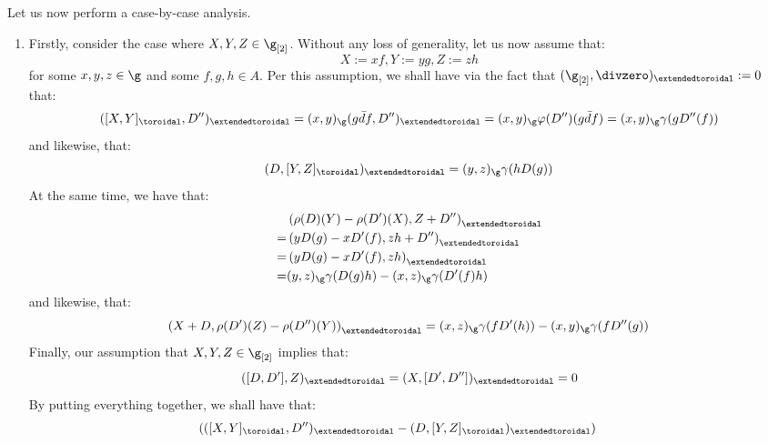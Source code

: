                 Let us now perform a case-by-case analysis.
                \begin{enumerate}
                    \item Firstly, consider the case where $X, Y, Z \in \g_{[2]}$. Without any loss of generality, let us now assume that:
                        $$X := xf, Y := yg, Z := zh$$
                    for some $x, y, z \in \g$ and some $f, g, h \in A$. Per this assumption, we shall have via the fact that $(\g_{[2]}, \divzero)_{\extendedtoroidal} := 0$ that:
                        $$( [X, Y]_{\toroidal}, D'')_{\extendedtoroidal} = (x, y)_{\g} ( g \bar{d}f, D'')_{\extendedtoroidal} = (x, y)_{\g} \varphi(D'')(g \bar{d}f) = (x, y)_{\g} \gamma( g D''(f) )$$
                    and likewise, that:
                        $$(D, [Y, Z]_{\toroidal})_{\extendedtoroidal} = (y, z)_{\g} \gamma( h D(g) )$$
                    At the same time, we have that:
                        $$
                            \begin{aligned}
                                & \left(\rho(D)(Y) - \rho(D')(X), Z + D'' \right)_{\extendedtoroidal}
                                \\
                                = & \left( y D(g) - x D'(f), zh + D'' \right)_{\extendedtoroidal}
                                \\
                                = & \left( y D(g) - x D'(f), zh \right)_{\extendedtoroidal}
                                \\
                                = & (y, z)_{\g} \gamma( D(g) h ) - (x, z)_{\g} \gamma( D'(f) h )
                            \end{aligned}
                        $$
                    and likewise, that:
                        $$\left( X + D, \rho(D')(Z) - \rho(D'')(Y) \right)_{\extendedtoroidal} = (x, z)_{\g} \gamma( f D'(h) ) - (x, y)_{\g} \gamma( f D''(g) )$$
                    Finally, our assumption that $X, Y, Z \in \g_{[2]}$ implies that:
                        $$([D, D'], Z)_{\extendedtoroidal} = (X, [D', D''])_{\extendedtoroidal} = 0$$
                    By putting everything together, we shall have that:
                        $$
                            \begin{aligned}
                                &
                                    \begin{aligned}
                                    & \left( ( [X, Y]_{\toroidal}, D'')_{\extendedtoroidal} - (D, [Y, Z]_{\toroidal})_{\extendedtoroidal} \right)

\end{aligned}
\end{aligned}$$
\end{enumerate}
